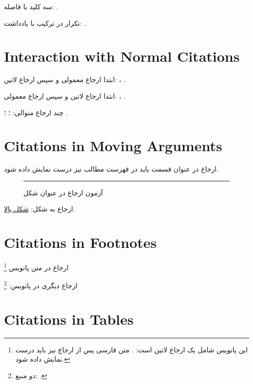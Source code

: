 \documentclass{article}
\begin{document}
    سه کلید با فاصله:
    .

    تکرار در ترکیب با یادداشت:
    .

    \section{Interaction with Normal Citations}

    ابتدا ارجاع معمولی و سپس ارجاع لاتین:
    \cite{knuth}، .

    ابتدا ارجاع لاتین و سپس ارجاع معمولی:
    ، \cite{mittelbach}.

    چند ارجاع متوالی:
    ؛
    ؛
    \cite{mittelbach}.

    \section{Citations in Moving Arguments
        \texorpdfstring{}{}}

    ارجاع در عنوان قسمت باید در فهرست مطالب نیز درست نمایش داده شود.

    \begin{figure}[htbp]
        \centering
        \rule{0.65\linewidth}{18mm}
        \caption{آزمون ارجاع در عنوان شکل
            }
        \label{fig:citation}
    \end{figure}

    ارجاع به شکل:
    \hyperref[fig:citation]{شکل بالا}.

    \section{Citations in Footnotes}

    ارجاع در متن پانویس%
    \footnote{
        این پانویس شامل یک ارجاع لاتین است:
        .
        متن فارسی پس از ارجاع نیز باید درست نمایش داده شود.
    }

    ارجاع دیگری در پانویس:
    \footnote{
        دو منبع:
        .
    }

    \section{Citations in Tables}
\end{document}
